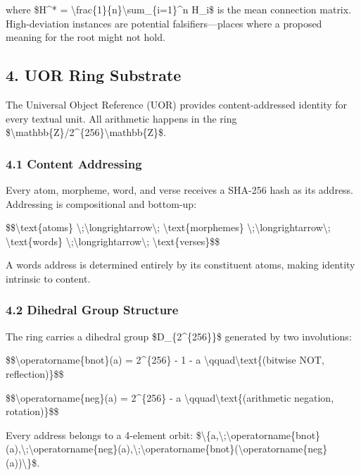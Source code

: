 \documentclass[12pt,a4paper]{article}
\begin{document}
where \$H\^{}* =
\textbackslash frac\{1\}\{n\}\textbackslash sum\_\{i=1\}\^{}n H\_i\$ is
the mean connection matrix. High-deviation instances are potential
falsifiers---places where a proposed meaning for the root might not
hold.

\subsection{4. UOR Ring Substrate}\label{uor}

The Universal Object Reference (UOR) provides content-addressed identity
for every textual unit. All arithmetic happens in the ring
\$\textbackslash mathbb\{Z\}/2\^{}\{256\}\textbackslash mathbb\{Z\}\$.

\subsubsection{4.1 Content Addressing}\label{content-addressing}

Every atom, morpheme, word, and verse receives a SHA-256 hash as its
address. Addressing is compositional and bottom-up:

\$\$\textbackslash text\{atoms\}
\textbackslash;\textbackslash longrightarrow\textbackslash;
\textbackslash text\{morphemes\}
\textbackslash;\textbackslash longrightarrow\textbackslash;
\textbackslash text\{words\}
\textbackslash;\textbackslash longrightarrow\textbackslash;
\textbackslash text\{verses\}\$\$

A word\textquotesingle s address is determined entirely by its
constituent atoms, making identity intrinsic to content.

\subsubsection{4.2 Dihedral Group
Structure}\label{dihedral-group-structure}

The ring carries a dihedral group \$D\_\{2\^{}\{256\}\}\$ generated by
two involutions:

\$\$\textbackslash operatorname\{bnot\}(a) = 2\^{}\{256\} - 1 - a
\textbackslash qquad\textbackslash text\{(bitwise NOT, reflection)\}\$\$

\$\$\textbackslash operatorname\{neg\}(a) = 2\^{}\{256\} - a
\textbackslash qquad\textbackslash text\{(arithmetic negation,
rotation)\}\$\$

Every address belongs to a 4-element orbit:
\$\textbackslash\{a,\textbackslash;\textbackslash operatorname\{bnot\}(a),\textbackslash;\textbackslash operatorname\{neg\}(a),\textbackslash;\textbackslash operatorname\{bnot\}(\textbackslash operatorname\{neg\}(a))\textbackslash\}\$.
\end{document}
